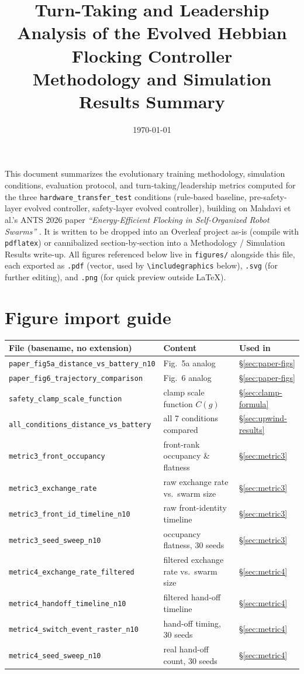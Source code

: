 \documentclass[11pt]{article}
\title{Turn-Taking and Leadership Analysis of the Evolved Hebbian Flocking Controller\\
\large Methodology and Simulation Results Summary}
\author{}
\date{\today}
\begin{document}
\maketitle

\noindent This document summarizes the evolutionary training methodology, simulation conditions,
evaluation protocol, and turn-taking/leadership metrics computed for the three
\texttt{hardware\_transfer\_test} conditions (rule-based baseline, pre-safety-layer evolved
controller, safety-layer evolved controller), building on Mahdavi et al.'s ANTS 2026 paper
\emph{``Energy-Efficient Flocking in Self-Organized Robot Swarms''} \cite{mahdavi2026}. It is
written to be dropped into an Overleaf
project as-is (compile with \texttt{pdflatex}) or cannibalized section-by-section into a
Methodology / Simulation Results write-up. All figures referenced below live in
\texttt{figures/} alongside this file, each exported as \texttt{.pdf} (vector, used by
\texttt{\textbackslash includegraphics} below), \texttt{.svg} (for further editing), and
\texttt{.png} (for quick preview outside LaTeX).

\section*{Figure import guide}
\begin{center}
\begin{tabular}{@{}lll@{}}
\toprule
\textbf{File (basename, no extension)} & \textbf{Content} & \textbf{Used in} \\
\midrule
\texttt{paper\_fig5a\_distance\_vs\_battery\_n10} & Fig.~5a analog & \S\ref{sec:paper-figs} \\
\texttt{paper\_fig6\_trajectory\_comparison} & Fig.~6 analog & \S\ref{sec:paper-figs} \\
\texttt{safety\_clamp\_scale\_function} & clamp scale function $C(g)$ & \S\ref{sec:clamp-formula} \\
\texttt{all\_conditions\_distance\_vs\_battery} & all 7 conditions compared & \S\ref{sec:upwind-results} \\
\texttt{metric3\_front\_occupancy} & front-rank occupancy \& flatness & \S\ref{sec:metric3} \\
\texttt{metric3\_exchange\_rate} & raw exchange rate vs.\ swarm size & \S\ref{sec:metric3} \\
\texttt{metric3\_front\_id\_timeline\_n10} & raw front-identity timeline & \S\ref{sec:metric3} \\
\texttt{metric3\_seed\_sweep\_n10} & occupancy flatness, 30 seeds & \S\ref{sec:metric3} \\
\texttt{metric4\_exchange\_rate\_filtered} & filtered exchange rate vs.\ swarm size & \S\ref{sec:metric4} \\
\texttt{metric4\_handoff\_timeline\_n10} & filtered hand-off timeline & \S\ref{sec:metric4} \\
\texttt{metric4\_switch\_event\_raster\_n10} & hand-off timing, 30 seeds & \S\ref{sec:metric4} \\
\texttt{metric4\_seed\_sweep\_n10} & real hand-off count, 30 seeds & \S\ref{sec:metric4} \\
\bottomrule
\end{tabular}
\end{center}
\end{document}
